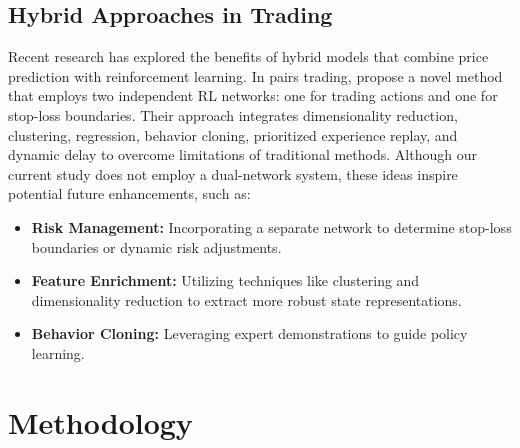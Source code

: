 \documentclass[11pt]{article}
\begin{document}
\subsection{Hybrid Approaches in Trading}
Recent research has explored the benefits of hybrid models that combine price prediction with reinforcement learning. In pairs trading, \citep{kim2022hybrid} propose a novel method that employs two independent RL networks: one for trading actions and one for stop-loss boundaries. Their approach integrates dimensionality reduction, clustering, regression, behavior cloning, prioritized experience replay, and dynamic delay to overcome limitations of traditional methods. Although our current study does not employ a dual-network system, these ideas inspire potential future enhancements, such as:
\begin{itemize}
  \item \textbf{Risk Management:} Incorporating a separate network to determine stop-loss boundaries or dynamic risk adjustments.
  \item \textbf{Feature Enrichment:} Utilizing techniques like clustering and dimensionality reduction to extract more robust state representations.
  \item \textbf{Behavior Cloning:} Leveraging expert demonstrations to guide policy learning.
\end{itemize}

\section{Methodology}
\end{document}
